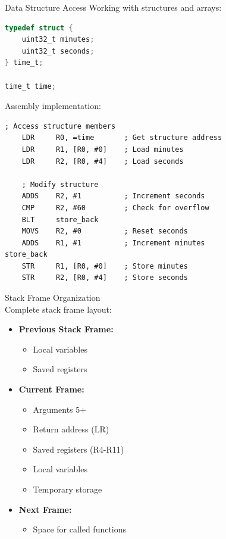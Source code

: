 \begin{example2}{Data Structure Access}
Working with structures and arrays:
\begin{lstlisting}[language=C, style=basesmol]
typedef struct {
    uint32_t minutes;
    uint32_t seconds;
} time_t;

time_t time;
\end{lstlisting}

Assembly implementation:
\begin{lstlisting}[language=armasm, style=basesmol]
    ; Access structure members
    LDR     R0, =time       ; Get structure address
    LDR     R1, [R0, #0]    ; Load minutes
    LDR     R2, [R0, #4]    ; Load seconds
    
    ; Modify structure
    ADDS    R2, #1          ; Increment seconds
    CMP     R2, #60         ; Check for overflow
    BLT     store_back
    MOVS    R2, #0          ; Reset seconds
    ADDS    R1, #1          ; Increment minutes
store_back
    STR     R1, [R0, #0]    ; Store minutes
    STR     R2, [R0, #4]    ; Store seconds
\end{lstlisting}
\end{example2}

\begin{concept}{Stack Frame Organization}\\
Complete stack frame layout:

\begin{itemize}
  \item \textbf{Previous Stack Frame:}
    \begin{itemize}
      \item Local variables
      \item Saved registers
    \end{itemize}
  \item \textbf{Current Frame:}
    \begin{itemize}
      \item Arguments 5+
      \item Return address (LR)
      \item Saved registers (R4-R11)
      \item Local variables
      \item Temporary storage
    \end{itemize}
  \item \textbf{Next Frame:}
    \begin{itemize}
      \item Space for called functions
    \end{itemize}
\end{itemize}
\end{concept}

